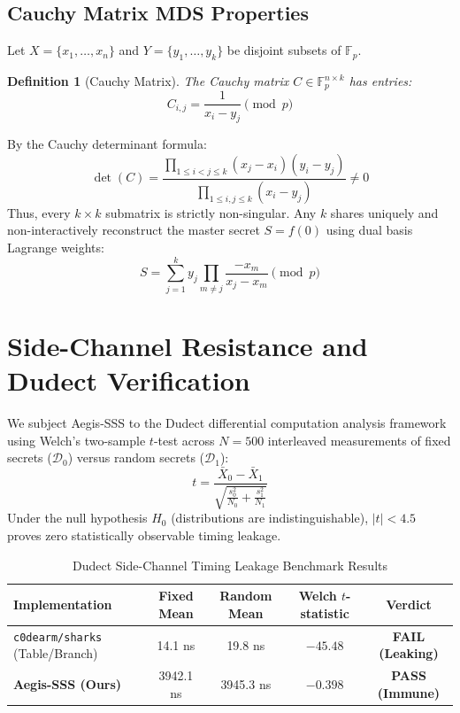 \documentclass[11pt,a4paper]{article}
\newtheorem{definition}{Definition}
\begin{document}
\subsection{Cauchy Matrix MDS Properties}
Let $X = \{x_1, \dots, x_n\}$ and $Y = \{y_1, \dots, y_k\}$ be disjoint subsets of $\mathbb{F}_p$.
\begin{definition}[Cauchy Matrix]
The Cauchy matrix $C \in \mathbb{F}_p^{n \times k}$ has entries:
\begin{equation}
C_{i, j} = \frac{1}{x_i - y_j} \pmod p
\end{equation}
\end{definition}

By the Cauchy determinant formula:
\begin{equation}
\det(C) = \frac{\prod_{1 \le i < j \le k} (x_j - x_i)(y_i - y_j)}{\prod_{1 \le i, j \le k} (x_i - y_j)} \ne 0
\end{equation}
Thus, every $k \times k$ submatrix is strictly non-singular. Any $k$ shares uniquely and non-interactively reconstruct the master secret $S = f(0)$ using dual basis Lagrange weights:
\begin{equation}
S = \sum_{j=1}^k y_j \prod_{m \ne j} \frac{-x_m}{x_j - x_m} \pmod p
\end{equation}

\section{Side-Channel Resistance and Dudect Verification}
We subject Aegis-SSS to the Dudect differential computation analysis framework using Welch's two-sample $t$-test across $N = 500$ interleaved measurements of fixed secrets ($\mathcal{D}_0$) versus random secrets ($\mathcal{D}_1$):
\begin{equation}
t = \frac{\bar{X}_0 - \bar{X}_1}{\sqrt{\frac{s_0^2}{N_0} + \frac{s_1^2}{N_1}}}
\end{equation}
Under the null hypothesis $H_0$ (distributions are indistinguishable), $|t| < 4.5$ proves zero statistically observable timing leakage.

\begin{table}[h]
\centering
\begin{tabular}{@{}lcccc@{}}
\toprule
\textbf{Implementation} & \textbf{Fixed Mean} & \textbf{Random Mean} & \textbf{Welch $t$-statistic} & \textbf{Verdict} \\
\midrule
\texttt{c0dearm/sharks} (Table/Branch) & 14.1 ns & 19.8 ns & $-45.48$ & \textbf{FAIL (Leaking)} \\
\textbf{Aegis-SSS (Ours)} & 3942.1 ns & 3945.3 ns & $\mathbf{-0.398}$ & \textbf{PASS (Immune)} \\
\bottomrule
\end{tabular}
\caption{Dudect Side-Channel Timing Leakage Benchmark Results}
\end{table}
\end{document}

